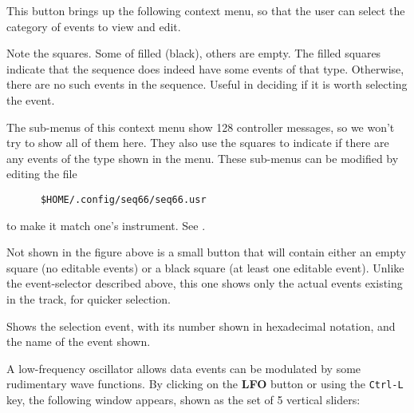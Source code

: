    \setcounter{ItemCounter}{0}      %

   This button brings up the following context menu, so that the user can
   select the category of events to view and edit.


   Note the squares.  Some of filled (black), others are empty.  The filled
   squares indicate that the sequence does indeed have some events of that
   type.  Otherwise, there are no such events in the sequence.
   Useful in deciding if it is worth selecting the event.

   The sub-menus of this context menu show 128 controller messages,
   so we won't try to show all of them here.  They also use the squares to
   indicate if there are any events of the type shown in the menu.
   These sub-menus can be modified by editing the file
   
   \begin{verbatim}
      $HOME/.config/seq66/seq66.usr
   \end{verbatim}

   to make it match one's instrument.  See .

   Not shown in the figure above is a small button that will contain either
   an empty square (no editable events) or a black square (at least one
   editable event).  Unlike the event-selector described above, this one
   shows only the actual events existing in the track, for quicker selection.

   Shows the selection event, with its number shown in hexadecimal notation,
   and the name of the event shown.

   A low-frequency oscillator allows data events
   can be modulated by some rudimentary wave functions.
   By clicking on the \textbf{LFO} button or using the \texttt{Ctrl-L} key,
   the following window appears, shown as the set of 5 vertical sliders:

